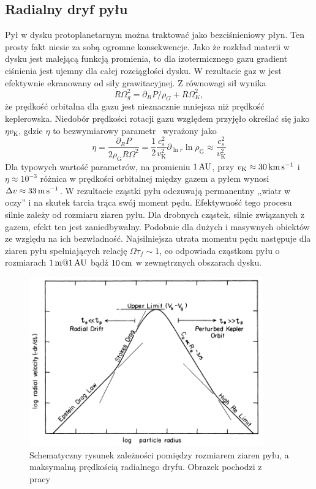 \subsection{Radialny dryf pyłu}
Pył w dysku protoplanetarnym można traktować jako bezciśnieniowy płyn. Ten
prosty fakt niesie za sobą ogromne konsekwencje. Jako że rozkład materii w dysku
jest malejącą funkcją promienia, to dla izotermicznego gazu gradient ciśnienia
jest ujemny dla całej rozciągłości dysku. W rezultacie gaz w jest efektywnie
ekranowany od siły grawitacyjnej. Z równowagi sił wynika
\begin{equation}
   R\Omega_g^2 = \partial_R P / \rho_G + R\Omega_K^2,
\end{equation}
że prędkość orbitalna dla gazu jest nieznacznie mniejsza niż prędkość
keplerowska. Niedobór prędkości rotacji gazu względem przyjęło określać się jako
$\eta v_\textrm{K}$, gdzie $\eta$ to bezwymiarowy parametr~\cite{Nakagawa86}
wyrażony jako
\begin{equation}
   \label{eq:eta}
   \eta = \frac{\partial_R P}{2\rho_\textrm{G} R \Omega^2} = \frac{1}{2}
   \frac{c_s^2}{v_\textrm{K}^2} \partial_{\ln r} \ln \rho_{\textrm{G}} \approx
   \frac{c_s^2}{v_\textrm{K}^2}
\end{equation}
Dla typowych wartość parametrów, na promieniu $1\hbox{$\thinspace\textrm{AU}$}$, przy $v_\textrm{K}\approx
30\hbox{$\thinspace\textrm{km}$}\hbox{$\thinspace\textrm{s}$}^{-1}$ i $\eta \approx 10^{-3}$ różnica w prędkości orbitalnej między
gazem a pyłem wynosi $\Delta v \approx 33\hbox{$\thinspace\textrm{m}$}\hbox{$\thinspace\textrm{s}$}^{-1}$.
W rezultacie cząstki pyłu odczuwają permanentny ,,wiatr w oczy'' i na skutek
tarcia trąca swój moment pędu. Efektywność tego procesu silnie zależy od
rozmiaru ziaren pyłu. Dla drobnych cząstek, silnie związanych z gazem, efekt ten
jest zaniedbywalny. Podobnie dla dużych i masywnych obiektów ze względu na ich
bezwładność. Najsilniejsza utrata momentu pędu następuje dla ziaren pyłu
spełniających relację $\Omega \tau_f \sim 1$, co odpowiada cząstkom pyłu
o rozmiarach $1\hbox{$\thinspace\textrm{m}$} @ 1\hbox{$\thinspace\textrm{AU}$}$ bądź $10\hbox{$\thinspace\textrm{cm}$}$ w zewnętrznych obszarach dysku.

\begin{figure}
   \includegraphics[width=0.9\textwidth]{figures/chap1_drift.png}
   \caption{Schematyczny rysunek zależności pomiędzy rozmiarem ziaren pyłu, a
   maksymalną prędkością radialnego dryfu. Obrazek pochodzi z
   pracy~\cite{weidenschilling-77}}
   \label{fig:chap1_drift}
\end{figure}

